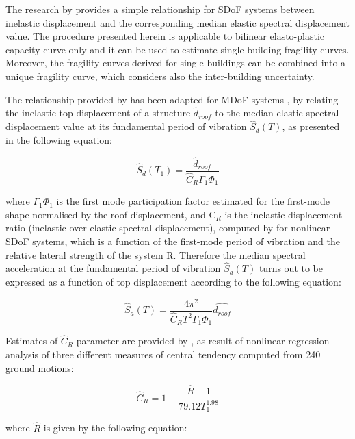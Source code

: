 The research by \citep{RuizGarciaMiranda2007} provides a simple relationship for SDoF systems between inelastic displacement and the corresponding median elastic spectral displacement value. The procedure presented herein is applicable to bilinear elasto-plastic capacity curve only and it can be used to estimate single building fragility curves. Moreover, the fragility curves derived for single buildings can be combined into a unique fragility curve, which considers also the inter-building uncertainty.

The relationship provided by \citep{RuizGarciaMiranda2007} has been adapted for MDoF systems \citep{Vamvatsikos2014}, by relating the inelastic top displacement of a structure $\hat{d}_{roof}$ to the median elastic spectral displacement value at its fundamental period of vibration $\hat{S}_{d}(T)$, as presented in the following equation:

\begin{equation}
\hat{S}_d(T_1) = \frac{\hat{d}_{roof}}{\hat{C}_R \Gamma_1 \Phi_1}
\label{eq:basic_RGM}
\end{equation}

where $\Gamma_1 \Phi_1$ is the first mode participation factor estimated for the first-mode shape normalised by the roof displacement, and C$_R$ is the inelastic displacement ratio (inelastic over elastic spectral displacement), computed by \citep{RuizGarciaMiranda2007} for nonlinear SDoF systems, which is a function of the first-mode period of vibration and the relative lateral strength of the system R. Therefore the median spectral acceleration at the fundamental period of vibration $\hat{S}_{a}(T)$ turns out to be expressed as a function of top displacement according to the following equation:

\begin{equation}
\hat{S}_{a}(T) = \frac{4 \pi^2}{\hat{C}_R T^2 \Gamma_1 \Phi_1} \hat{d_{roof}}
\label{eq:Sa_RGM}
\end{equation}

Estimates of $\hat{C}_R$ parameter are provided by \citep{RuizGarciaMiranda2007}, as result of nonlinear regression analysis of three different measures of central tendency computed from 240 ground motions:

\begin{equation}
\hat{C}_R = 1 + \frac{\hat{R} - 1}{79.12 T_1 ^{1.98}}
\label{eq:Cr_RGM}
\end{equation}

where $\hat{R}$ is given by the following equation:


